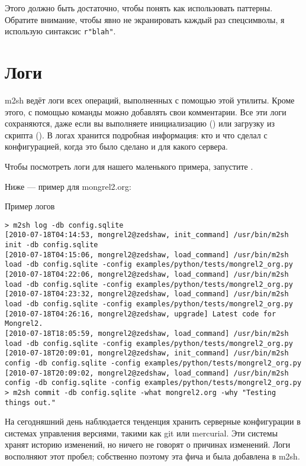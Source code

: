 Этого должно быть достаточно, чтобы понять как использовать паттерны.
Обратите внимание, чтобы явно не экранировать каждый раз спецсимволы,
я использую синтаксис \verb|r"blah"|.


\section{Логи}

m2sh ведёт логи всех операций, выполненных с помощью этой утилиты.
Кроме этого, с помощью команды  можно добавлять
свои комментарии. Все эти логи сохраняются, даже если вы выполняете
инициализацию () или загрузку из скрипта (). В логах хранится подробная информация: кто и что сделал с
конфигурацией, когда это было сделано и для какого сервера.

Чтобы посмотреть логи для нашего маленького примера, запустите
.

Ниже --- пример для mongrel2.org:

\begin{code}{Пример логов}
\begin{lstlisting}
> m2sh log -db config.sqlite 
[2010-07-18T04:14:53, mongrel2@zedshaw, init_command] /usr/bin/m2sh init -db config.sqlite
[2010-07-18T04:15:06, mongrel2@zedshaw, load_command] /usr/bin/m2sh load -db config.sqlite -config examples/python/tests/mongrel2_org.py
[2010-07-18T04:22:06, mongrel2@zedshaw, load_command] /usr/bin/m2sh load -db config.sqlite -config examples/python/tests/mongrel2_org.py
[2010-07-18T04:23:32, mongrel2@zedshaw, load_command] /usr/bin/m2sh load -db config.sqlite -config examples/python/tests/mongrel2_org.py
[2010-07-18T04:26:16, mongrel2@zedshaw, upgrade] Latest code for Mongrel2.
[2010-07-18T18:05:59, mongrel2@zedshaw, load_command] /usr/bin/m2sh load -db config.sqlite -config examples/python/tests/mongrel2_org.py
[2010-07-18T20:09:01, mongrel2@zedshaw, init_command] /usr/bin/m2sh config -db config.sqlite -config examples/python/tests/mongrel2_org.py
[2010-07-18T20:09:02, mongrel2@zedshaw, load_command] /usr/bin/m2sh config -db config.sqlite -config examples/python/tests/mongrel2_org.py
> m2sh commit -db config.sqlite -what mongrel2.org -why "Testing things out."
\end{lstlisting}
\end{code}

На сегодняшний день наблюдается тенденция хранить серверные
конфигурации в системах управления версиями, такими как git или
mercurial. Эти системы хранят историю изменений, но ничего не говорят
о причинах изменений. Логи восполняют этот пробел; собственно поэтому
эта фича и была добавлена в m2sh.

